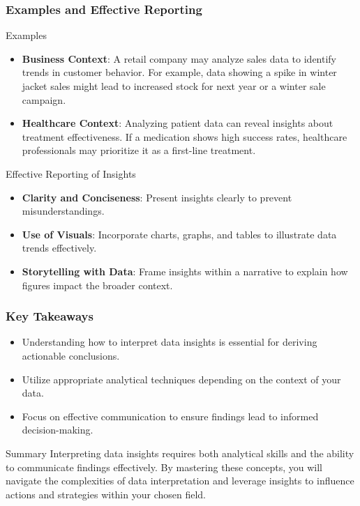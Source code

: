 \documentclass[aspectratio=169]{beamer}
\begin{document}
\begin{frame}[fragile]
    \frametitle{Examples and Effective Reporting}
    \begin{block}{Examples}
        \begin{itemize}
            \item \textbf{Business Context}: A retail company may analyze sales data to identify trends in customer behavior. For example, data showing a spike in winter jacket sales might lead to increased stock for next year or a winter sale campaign.
            \item \textbf{Healthcare Context}: Analyzing patient data can reveal insights about treatment effectiveness. If a medication shows high success rates, healthcare professionals may prioritize it as a first-line treatment.
        \end{itemize}
    \end{block}

    \begin{block}{Effective Reporting of Insights}
        \begin{itemize}
            \item \textbf{Clarity and Conciseness}: Present insights clearly to prevent misunderstandings.
            \item \textbf{Use of Visuals}: Incorporate charts, graphs, and tables to illustrate data trends effectively.
            \item \textbf{Storytelling with Data}: Frame insights within a narrative to explain how figures impact the broader context.
        \end{itemize}
    \end{block}
\end{frame}

\begin{frame}[fragile]
    \frametitle{Key Takeaways}
    \begin{itemize}
        \item Understanding how to interpret data insights is essential for deriving actionable conclusions.
        \item Utilize appropriate analytical techniques depending on the context of your data.
        \item Focus on effective communication to ensure findings lead to informed decision-making.
    \end{itemize}

    \begin{block}{Summary}
        Interpreting data insights requires both analytical skills and the ability to communicate findings effectively. By mastering these concepts, you will navigate the complexities of data interpretation and leverage insights to influence actions and strategies within your chosen field.
    \end{block}
\end{frame}
\end{document}
